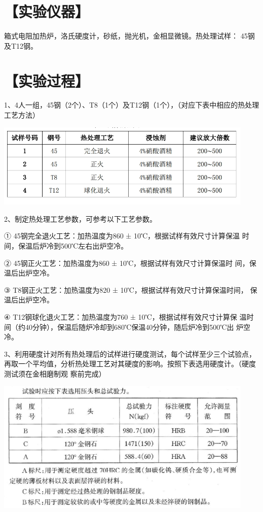 \documentclass[a4paper,utf8]{article}
\begin{document}
\section*{【实验仪器】}%
箱式电阻加热炉，洛氏硬度计，砂纸，抛光机，金相显微镜。热处理试样：
45钢及T12钢。
\section*{【实验过程】}%
1、4人一组，45钢（2个）、T8（1个）及T12钢（1个），（对应下表中相应的热处理工艺方法）

\begin{center}
    \includegraphics[width=350pt]{3.png}
\end{center}

2、制定热处理工艺参数，可参考以下工艺参数。

① 45钢完全退火工艺：加热温度为860 ± 10℃，根据试样有效尺寸计算保温
时间，保温后炉冷到500℃左右出炉空冷。

② 45钢正火工艺：加热温度为860 ± 10℃，根据试样有效尺寸计算保温时
间，保温后出炉空冷。

③ T8钢正火工艺：加热温度为820 ± 10℃，根据试样有效尺寸计算保温时间，
保温后出炉空冷。

④ T12钢球化退火工艺：加热温度为760 ± 10℃，根据试样有效尺寸计算保
温时间（约40分钟），保温后随炉冷却到680℃保温40分钟，随后炉冷到500℃出
炉空冷。

3、利用硬度计对所有热处理后的试样进行硬度测试，每个试样至少三个试验点，再取一个平均值，分析热处理工艺对其硬度的影响。按照下表选用硬度计。（硬度测试须在金相磨制观
察前完成）

\begin{center}
    \includegraphics[width=350pt]{4.png}
\end{center}
\end{document}
